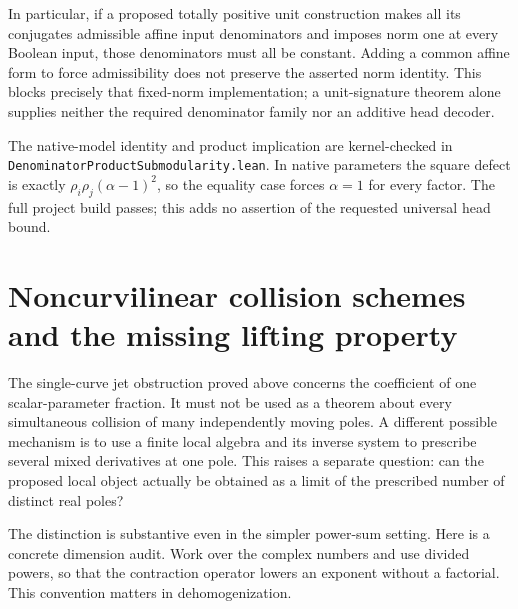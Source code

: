 \documentclass[11pt]{article}
\begin{document}
In particular, if a proposed totally positive unit construction makes
all its conjugates admissible affine input denominators and imposes
norm one at every Boolean input, those denominators must all be
constant. Adding a common affine form to force admissibility does
not preserve the asserted norm identity. This blocks precisely that
fixed-norm implementation; a unit-signature theorem alone supplies
neither the required denominator family nor an additive head decoder.

The native-model identity and product implication are kernel-checked in
\texttt{DenominatorProductSubmodularity.lean}. In native parameters the
square defect is exactly $\rho_i\rho_j(\alpha-1)^2$, so the equality
case forces $\alpha=1$ for every factor. The full project build passes;
this adds no assertion of the requested universal head bound.

\section{Noncurvilinear collision schemes and the missing lifting property}

The single-curve jet obstruction proved above concerns the coefficient
of one scalar-parameter fraction. It must not be used as a theorem
about every simultaneous collision of many independently moving poles.
A different possible mechanism is to use a finite local algebra and its
inverse system to prescribe several mixed derivatives at one pole.
This raises a separate question: can the proposed local object actually
be obtained as a limit of the prescribed number of distinct real poles?

The distinction is substantive even in the simpler power-sum setting.
Here is a concrete dimension audit. Work over the complex numbers and
use divided powers, so that the contraction operator lowers an exponent
without a factorial. This convention matters in dehomogenization.
\end{document}
